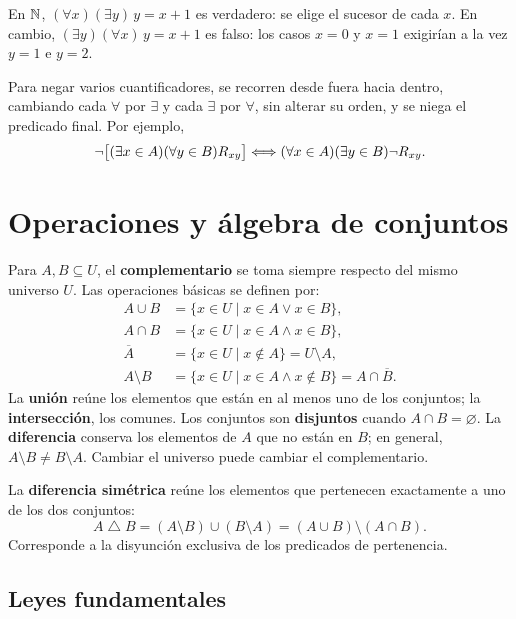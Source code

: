 \begin{ejemplo}
En $\mathbb{N}$, $(\forall x)(\exists y)\,y=x+1$ es verdadero: se elige el
sucesor de cada $x$. En cambio, $(\exists y)(\forall x)\,y=x+1$ es
falso: los casos $x=0$ y $x=1$ exigirían a la vez $y=1$ e $y=2$.
\end{ejemplo}

Para negar varios cuantificadores, se recorren desde fuera hacia dentro,
cambiando cada $\forall$ por $\exists$ y cada $\exists$ por $\forall$,
sin alterar su orden, y se niega el predicado final. Por ejemplo,
\[
 \neg\bigl[(\exists x\in A)(\forall y\in B)R_{xy}\bigr]
 \Longleftrightarrow(\forall x\in A)(\exists y\in B)\neg R_{xy}.
\]

\section{Operaciones y álgebra de conjuntos}
\label{sec:algebra-conjuntos}

Para $A,B\subseteq U$, el \textbf{complementario} se toma siempre
respecto del mismo universo $U$. Las operaciones básicas se definen por:
\begin{align*}
 A\cup B&=\{x\in U\mid x\in A\vee x\in B\},\\
 A\cap B&=\{x\in U\mid x\in A\wedge x\in B\},\\
 \overline A&=\{x\in U\mid x\notin A\}=U\setminus A,\\
 A\setminus B&=\{x\in U\mid x\in A\wedge x\notin B\}
                =A\cap\overline B.
\end{align*}
La \textbf{unión} reúne los elementos que están en al menos uno de los
conjuntos; la \textbf{intersección}, los comunes. Los conjuntos son
\textbf{disjuntos} cuando $A\cap B=\varnothing$.
La \textbf{diferencia} conserva los elementos de $A$ que no están en $B$;
en general, $A\setminus B\ne B\setminus A$.
Cambiar el universo puede cambiar el complementario.

La \textbf{diferencia simétrica} reúne los elementos que pertenecen
exactamente a uno de los dos conjuntos:
\[
 A\mathbin{\triangle}B
  =(A\setminus B)\cup(B\setminus A)
  =(A\cup B)\setminus(A\cap B).
\]
Corresponde a la disyunción exclusiva de los predicados de pertenencia.

\subsection*{Leyes fundamentales}

